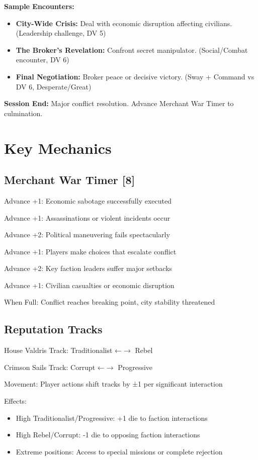 \documentclass[11pt]{article}
\newenvironment{mechanics}{\begin{description}[leftmargin=*,style=standard]}{\end{description}}
\begin{document}
\textbf{Sample Encounters:}
\begin{itemize}
\item \textbf{City-Wide Crisis:} Deal with economic disruption affecting civilians. (Leadership challenge, DV 5)
\item \textbf{The Broker's Revelation:} Confront secret manipulator. (Social/Combat encounter, DV 6)
\item \textbf{Final Negotiation:} Broker peace or decisive victory. (Sway + Command vs DV 6, Desperate/Great)
\end{itemize}

\textbf{Session End:} Major conflict resolution. Advance Merchant War Timer to culmination.

\section{Key Mechanics}

\subsection{Merchant War Timer [8]}
\begin{mechanics}
\item[Advance +1:] Economic sabotage successfully executed
\item[Advance +1:] Assassinations or violent incidents occur
\item[Advance +2:] Political maneuvering fails spectacularly
\item[Advance +1:] Players make choices that escalate conflict
\item[Advance +2:] Key faction leaders suffer major setbacks
\item[Advance +1:] Civilian casualties or economic disruption
\item[When Full:] Conflict reaches breaking point, city stability threatened
\end{mechanics}

\subsection{Reputation Tracks}
\begin{mechanics}
\item[House Valdris Track:] Traditionalist ←$\rightarrow$ Rebel
\item[Crimson Sails Track:] Corrupt ←$\rightarrow$ Progressive
\item[Movement:] Player actions shift tracks by ±1 per significant interaction
\item[Effects:] 
  \begin{itemize}
    \item High Traditionalist/Progressive: +1 die to faction interactions
    \item High Rebel/Corrupt: -1 die to opposing faction interactions
    \item Extreme positions: Access to special missions or complete rejection
  \end{itemize}
\end{mechanics}
\end{document}
